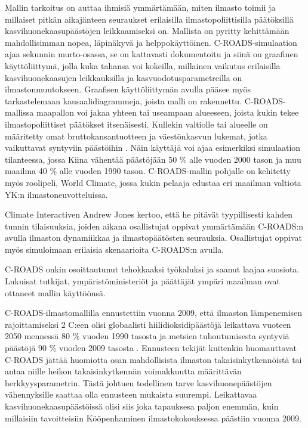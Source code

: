 \documentclass[finnish,12pt,a4paper,pdftex]{article}
\begin{document}
\begin{onehalfspacing}
Mallin tarkoitus on auttaa ihmisiä ymmärtämään, miten ilmasto toimii ja millaiset pitkän aikajänteen seuraukset erilaisilla ilmastopoliittisilla päätöksillä kasvihuonekaasupäästöjen leikkaamiseksi on. Mallista on pyritty kehittämään mahdollisimman nopea, läpinäkyvä ja helppokäyttöinen. C-ROADS-simulaation ajaa sekunnin murto-osassa, se on kattavasti dokumentoitu ja siinä on graafinen käyttöliittymä, jolla kuka tahansa voi kokeilla, millainen vaikutus erilaisilla kasvihuonekaasujen leikkauksilla ja kasvuodotusparametreilla on ilmastonmuutokseen. Graafisen käyttöliittymän avulla pääsee myös tarkastelemaan kausaalidiagrammeja, joista malli on rakennettu. C-ROADS-mallissa maapallon voi jakaa yhteen tai useampaan alueeseen, joista kukin tekee ilmastopoliittiset päätökset itsenäisesti. \cite{Croads, CroadsWWW, CroadsFlightSimulator2011} Kullekin valtiolle tai alueelle on määritetty omat bruttokansantuotteen ja väestönkasvun lukemat, jotka vaikuttavat syntyviin päästöihin \cite{Fiddaman2012}. Näin käyttäjä voi ajaa esimerkiksi simulaation tilanteessa, jossa Kiina vähentää päästöjään 50 \% alle vuoden 2000 tason ja muu maailma 40 \% alle vuoden 1990 tason. C-ROADS-mallin pohjalle on kehitetty myös roolipeli, World Climate, jossa kukin pelaaja edustaa eri maailman valtiota YK:n ilmastoneuvotteluissa. \cite{CroadsWWW} 

Climate Interactiven Andrew Jones \cite{Jones2013} kertoo, että he pitävät tyypillisesti kahden tunnin tilaisuuksia, joiden aikana osallistujat oppivat ymmärtämään C-ROADS:n avulla ilmaston dynamiikkaa ja ilmastopäätösten seurauksia. Osallistujat oppivat myös simuloimaan erilaisia skenaarioita C-ROADS:n avulla. 

C-ROADS onkin osoittautunut tehokkaaksi työkaluksi ja saanut laajaa suosiota. Lukuisat tutkijat, ympäristöministeriöt ja päättäjät ympäri maailman ovat ottaneet mallin käyttöönsä. \cite{CroadsWWW, CroadsFlightSimulator2011, Jones2013} 

C-ROADS-ilmastomallilla ennustettiin vuonna 2009, että ilmaston lämpenemisen rajoittamiseksi 2 \degree C:een olisi globaalisti hiilidioksidipäästöjä leikattava vuoteen 2050 mennessä 80 \% vuoden 1990 tasosta ja metsien tuhoutumisesta syntyviä päästöjä 90 \%  vuoden 2009 tasosta \cite{Sawin2009, Sterman2011}. Ennusteen tekijät kuitenkin huomauttavat C-ROADS jättää huomiotta osan mahdollisista ilmaston takaisinkytkennöistä tai antaa niille heikon takaisinkytkennän voimakkuutta määrittävän herkkyysparametrin. Tästä johtuen todellinen tarve kasvihuonepäästöjen vähennyksille saattaa olla ennusteen mukaista suurempi. \cite{Sawin2009, Sterman2011} Leikattavaa kasvihuonekaasupäästöissä olisi siis joka tapauksesa paljon enemmän, kuin millaisiin tavoitteisiin Kööpenhaminen ilmastokokouksessa päästiin vuonna 2009. \cite{UNFCCCCopenhagen, Sawin2009}


\end{onehalfspacing}
\end{document}
